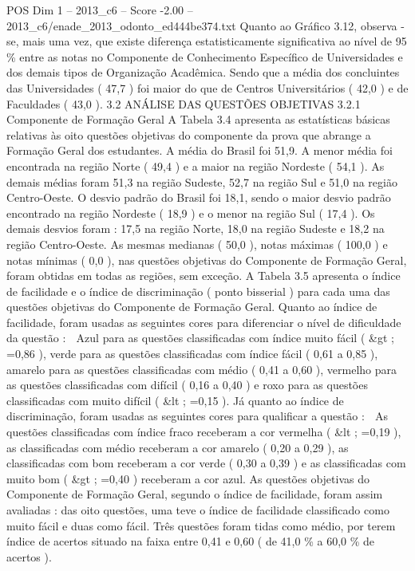\begin{textsample}{POS Dim 1 – 2013\_c6 – Score -2.00 – 2013\_c6/enade\_2013\_odonto\_ed444be374.txt}
Quanto ao Gráfico 3.12, observa -se, mais uma vez, que existe diferença estatisticamente significativa ao nível de 95 \% entre as notas no Componente de Conhecimento Específico de Universidades e dos demais tipos de Organização Acadêmica.
Sendo que a média dos concluintes das Universidades ( 47,7 ) foi maior do que de Centros Universitários ( 42,0 ) e de Faculdades ( 43,0 ). 3.2 ANÁLISE DAS QUESTÕES OBJETIVAS 3.2.1 Componente de Formação Geral A Tabela 3.4 apresenta as estatísticas básicas relativas às oito questões objetivas do componente da prova que abrange a Formação Geral dos estudantes.
A média do Brasil foi 51,9.
A menor média foi encontrada na região Norte ( 49,4 ) e a maior na região Nordeste ( 54,1 ).
As demais médias foram 51,3 na região Sudeste, 52,7 na região Sul e 51,0 na região Centro-Oeste.
O desvio padrão do Brasil foi 18,1, sendo o maior desvio padrão encontrado na região Nordeste ( 18,9 ) e o menor na região Sul ( 17,4 ).
Os demais desvios foram : 17,5 na região Norte, 18,0 na região Sudeste e 18,2 na região Centro-Oeste.
As mesmas medianas ( 50,0 ), notas máximas ( 100,0 ) e notas mínimas ( 0,0 ), nas questões objetivas do Componente de Formação Geral, foram obtidas em todas as regiões, sem exceção.
A Tabela 3.5 apresenta o índice de facilidade e o índice de discriminação ( ponto bisserial ) para cada uma das questões objetivas do Componente de Formação Geral.
Quanto ao índice de facilidade, foram usadas as seguintes cores para diferenciar o nível de dificuldade da questão :  Azul para as questões classificadas com índice muito fácil ( \&gt ; =0,86 ), verde para as questões classificadas com índice fácil ( 0,61 a 0,85 ), amarelo para as questões classificadas com médio ( 0,41 a 0,60 ), vermelho para as questões classificadas com difícil ( 0,16 a 0,40 ) e roxo para as questões classificadas com muito difícil ( \&lt ; =0,15 ).
Já quanto ao índice de discriminação, foram usadas as seguintes cores para qualificar a questão :  As questões classificadas com índice fraco receberam a cor vermelha ( \&lt ; =0,19 ), as classificadas com médio receberam a cor amarelo ( 0,20 a 0,29 ), as classificadas com bom receberam a cor verde ( 0,30 a 0,39 ) e as classificadas com muito bom ( \&gt ; =0,40 ) receberam a cor azul.
As questões objetivas do Componente de Formação Geral, segundo o índice de facilidade, foram assim avaliadas : das oito questões, uma teve o índice de facilidade classificado como muito fácil e duas como fácil.
Três questões foram tidas como médio, por terem índice de acertos situado na faixa entre 0,41 e 0,60 ( de 41,0 \% a 60,0 \% de acertos ).

\end{textsample}
